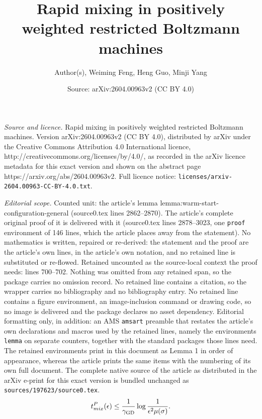 \documentclass[10pt,a4paper]{amsart}
\title{Rapid mixing in positively weighted restricted Boltzmann machines}
\author{Author(s), Weiming Feng, Heng Guo, Minji Yang}
\date{Source: arXiv:2604.00963v2 (CC BY 4.0)}
\begin{document}
\maketitle

\noindent\emph{Source and licence.} Rapid mixing in positively weighted restricted Boltzmann machines. Version arXiv:2604.00963v2 (CC BY 4.0), distributed by arXiv under the Creative Commons Attribution 4.0 International licence, http://creativecommons.org/licenses/by/4.0/, as recorded in the arXiv licence metadata for this exact version and shown on the abstract page https://arxiv.org/abs/2604.00963v2. Full licence notice: \texttt{licenses/arxiv-2604.00963-CC-BY-4.0.txt}.\par\smallskip

\noindent\textit{Editorial scope.} Counted unit: the article's lemma lemma:warm-start-configuration-general (source0.tex lines 2862--2870). The article's complete original proof of it is delivered with it (source0.tex lines 2878--3023, one \texttt{proof} environment of 146 lines, which the article places away from the statement). No mathematics is written, repaired or re-derived: the statement and the proof are the article's own lines, in the article's own notation, and no retained line is substituted or re-flowed.  Retained uncounted as the source-local context the proof needs: lines 700--702.  Nothing was omitted from any retained span, so the package carries no omission record.  No retained line contains a citation, so the wrapper carries no bibliography and no bibliography entry.  No retained line contains a figure environment, an image-inclusion command or drawing code, so no image is delivered and the package declares no asset dependency.  Editorial formatting only, in addition: an AMS \texttt{amsart} preamble that restates the article's own declarations and macros used by the retained lines, namely the environments \texttt{lemma} on separate counters, together with the standard packages those lines need.  The retained environments print in this document as Lemma 1 in order of appearance, whereas the article prints the same items with the numbering of its own full document.  The complete native source of the article as distributed in the arXiv e-print for this exact version is bundled unchanged as \texttt{sources/197623/source0.tex}.
\begin{align}\label{eq:mixing-time-glauber-gap}
t_{\textnormal{mix}}^P(\epsilon) \leq \frac{1}{\gamma_{\text{GD}}}\log \frac{1}{\epsilon^2 \mu(\sigma)}.
\end{align}
\end{document}
